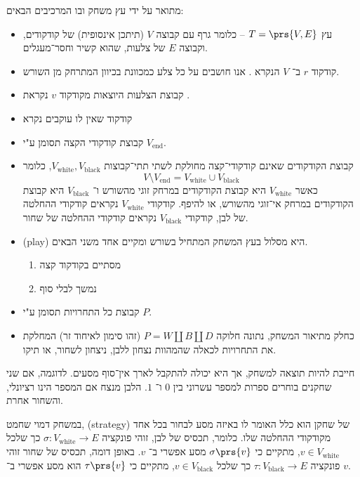 \documentclass[a4paper,10pt,twoside,openany]{book}
\begin{document}
\begin{definition}
מתואר על ידי עץ משחק ובו המרכיבים הבאים:
\begin{itemize}
\item עץ
$T = \prs{V,E}$ –
כלומר גרף עם קבוצה
$V$
(תיתכן אינסופית) של קודקודים, וקבוצה
$E$
של צלעות, שהוא קשיר וחסר־מעגלים.
\item קודקוד $r$
ב־%
$V$
הנקרא
.
אנו חושבים על כל צלע כמכוונת בכיוון המתרחק מן השורש.
\item קבוצת הצלעות היוצאות מקודקוד
$v$
נקראת
.
\item
קודקוד שאין לו עוקבים נקרא
\item
קבוצת קודקודי הקצה תסומן ע"י
$V_{\text{end}}$.
\item
קבוצת הקודקודים שאינם קודקודי־קצה מחולקת לשתי תתי־קבוצות
$V_{\text{white}}, V_{\text{black}}$,
כלומר
\[V \setminus V_{\text{end}} = V_{\text{white}} \cup V_{\text{black}}\]
כאשר
$V_{\text{white}}$
היא קבוצת הקודקודים במרחק זוגי מהשורש ו־%
$V_{\text{black}}$
היא קבוצת הקודקודים במרחק אי־זוגי מהשורש, או להיפף.
קודקודי
$V_{\text{white}}$
נקראים קודקודי ההחלטה של לבן, קודקודי
$V_{\text{black}}$
נקראים קודקודי ההחלטה של שחור.
\item {} (\textenglish{play})
היא מסלול בעץ המשחק המתחיל בשורש ומקיים אחד משני הבאים.
\begin{enumerate}[label = \alph*.]
\item מסתיים בקודקוד קצה
\item נמשך לבלי סוף
\end{enumerate}
\item קבוצת כל התחרויות תסומן ע"י
$P$.
\item כחלק מתיאור המשחק, נתונה חלוקה
$P = W \amalg B \amalg D$
(זהו סימון לאיחוד זר)
המחלקת את התחרויות לכאלה שהמהוות נצחון ללבן, ניצחון לשחור, או תיקו.
\end{itemize}
\end{definition}
\begin{remark}
חייבת להיות תוצאה למשחק, אך היא יכולה להתקבל לארך אין־סוף מסעים.
לדוגמה, אם שני שחקנים בוחרים ספרות למספר עשרוני בין
$0$
ו־%
$1$.
הלבן מנצח אם המספר הינו רציונלי, והשחור אחרת.
\end{remark}
\begin{definition}
במשחק דמוי שחמט,
 (\textenglish{strategy})
של שחקן הוא כלל האומר לו באיזה מסע לבחור בכל אחד מקודקודי ההחלטה שלו.
כלומר, תכסיס של לבן, זוהי פונקציה
$\sigma \colon V_{\text{white}} \to E$
כך שלכל
$v \in V_{\text{white}}$,
מתקיים כי
$\sigma\prs{v}$
מסע אפשרי ב־%
$v$.
באופן דומה, תכסיס של שחור זוהי פונקציה
$\tau \colon V_{\text{black}} \to E$
כך שלכל
$v \in V_{\text{black}}$,
מתקיים כי
$\tau\prs{v}$
הוא מסע אפשרי ב־%
$v$.
\end{definition}
\backmatter
\end{document}
